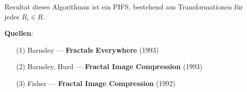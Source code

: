 \documentclass[afourpaper]{latex-classes/handout}
\begin{document}
Resultat dieses Algorithmus ist ein PIFS, bestehend aus Transformationen für jedes \( R_i \in R \).



\begin{marginfigure}
  \textbf{Quellen}:
  \begin{itemize}
    \item[(1)] Barnsley --- \textbf{Fractals Everywhere} (1993)
    \item[(2)] Barnsley, Hurd --- \textbf{Fractal Image Compression} (1993)
    \item[(3)] Fisher --- \textbf{Fractal Image Compression} (1992)
  \end{itemize}
\end{marginfigure}
\end{document}
